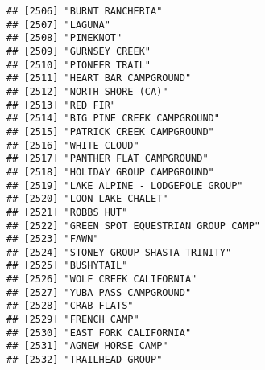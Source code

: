 \documentclass[
]{article}
\begin{document}
\begin{verbatim}
## [2506] "BURNT RANCHERIA"                                                                     
## [2507] "LAGUNA"                                                                              
## [2508] "PINEKNOT"                                                                            
## [2509] "GURNSEY CREEK"                                                                       
## [2510] "PIONEER TRAIL"                                                                       
## [2511] "HEART BAR CAMPGROUND"                                                                
## [2512] "NORTH SHORE (CA)"                                                                    
## [2513] "RED FIR"                                                                             
## [2514] "BIG PINE CREEK CAMPGROUND"                                                           
## [2515] "PATRICK CREEK CAMPGROUND"                                                            
## [2516] "WHITE CLOUD"                                                                         
## [2517] "PANTHER FLAT CAMPGROUND"                                                             
## [2518] "HOLIDAY GROUP CAMPGROUND"                                                            
## [2519] "LAKE ALPINE - LODGEPOLE GROUP"                                                       
## [2520] "LOON LAKE CHALET"                                                                    
## [2521] "ROBBS HUT"                                                                           
## [2522] "GREEN SPOT EQUESTRIAN GROUP CAMP"                                                    
## [2523] "FAWN"                                                                                
## [2524] "STONEY GROUP SHASTA-TRINITY"                                                         
## [2525] "BUSHYTAIL"                                                                           
## [2526] "WOLF CREEK CALIFORNIA"                                                               
## [2527] "YUBA PASS CAMPGROUND"                                                                
## [2528] "CRAB FLATS"                                                                          
## [2529] "FRENCH CAMP"                                                                         
## [2530] "EAST FORK CALIFORNIA"                                                                
## [2531] "AGNEW HORSE CAMP"                                                                    
## [2532] "TRAILHEAD GROUP"                                                                     

\end{verbatim}
\end{document}
